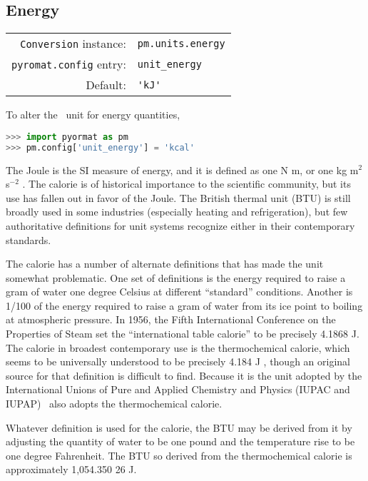 %
%

\subsection{Energy}\label{sec:units:energy}

\begin{tabular}{rl}
\hline
\verb|Conversion| instance: & \verb|pm.units.energy|\\
\verb|pyromat.config| entry: & \verb|unit_energy|\\
Default: & \verb|'kJ'|\\
\hline
\end{tabular}
\vspace{1em}

To alter the \PM\ unit for energy quantities,
\begin{lstlisting}[language=Python]
>>> import pyormat as pm
>>> pm.config['unit_energy'] = 'kcal'
\end{lstlisting}

The Joule is the SI measure of energy, and it is defined as one N m, or one kg m$^2$ s$^{-2}$ \cite[p.137]{si:2019}.  The calorie is of historical importance to the scientific community, but its use has fallen out in favor of the Joule.  The British thermal unit (BTU) is still broadly used in some industries (especially heating and refrigeration), but few authoritative definitions for unit systems recognize either in their contemporary standards.

The calorie has a number of alternate definitions that has made the unit somewhat problematic.  One set of definitions is the energy required to raise a gram of water one degree Celsius at different ``standard'' conditions.  Another is 1/100 of the energy required to raise a gram of water from its ice point to boiling at atmospheric pressure.  In 1956, the Fifth International Conference on the Properties of Steam set the ``international table calorie'' to be precisely 4.1868 J.  The calorie in broadest contemporary use is the thermochemical calorie, which seems to be universally understood to be precisely 4.184 J  \cite{nist:sp811}, though an original source for that definition is difficult to find.  Because it is the unit adopted by the International Unions of Pure and Applied Chemistry and Physics (IUPAC and IUPAP) \cite{crc} \PM\ also adopts the thermochemical calorie.

Whatever definition is used for the calorie, the BTU may be derived from it by adjusting the quantity of water to be one pound and the temperature rise to be one degree Fahrenheit.  The BTU so derived from the thermochemical calorie is approximately 1,054.350 26 J.

